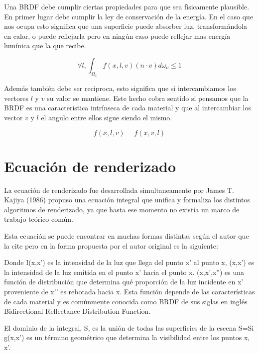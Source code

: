 Una BRDF debe cumplir ciertas propiedades para que sea físicamente plausible.
En primer lugar debe cumplir la ley de conservación de la energía. En el caso que nos ocupa esto significa que una superficie puede absorber luz, transformándola en calor, o puede reflejarla pero en ningún caso puede reflejar mas energía lumínica que la que recibe.

\begin{equation}
\forall l, \int_{\Omega_x} f(x,l,v) (n \cdot v) d\omega_o \leq 1
\end{equation}

Además también debe ser reciproca, esto significa que si intercambiamos los vectores $l$ y $v$ su valor se mantiene. Este hecho cobra sentido si pensamos que la BRDF es una característica intrínseca de cada material y que al intercambiar los vector $v$ y $l$ el angulo entre ellos sigue siendo el mismo.

\begin{equation}
f(x, l, v) = f(x, v, l)
\end{equation} 

\clearpage

\section{Ecuación de renderizado}

La ecuación de renderizado fue desarrollada simultaneamente por James T. Kajiya (1986) propuso una ecuación integral que unifica y formaliza los distintos algoritmos de renderizado, ya que hasta ese momento no existía un marco de trabajo teórico común.

Esta ecuación se puede encontrar en muchas formas distintas según el autor que la cite pero en la forma propuesta por el autor original es la siguiente:

Donde I(x,x’) es la intensidad de la luz que llega del punto x’ al punto x, (x,x') es la intensidad de la luz emitida en el punto x’ hacia el punto x. (x,x',x'') es una función de distribución que determina qué proporción de la luz incidente en x’ proveniente de x’’ es rebotada hacia x. Esta función depende de las características de cada material y es comúnmente conocida como BRDF de sus siglas en inglés Bidirectional Reflectance Distribution Function.

El dominio de la integral, S, es la unión de todas las superficies de la escena S=Si
g(x,x’) es un término geométrico que determina la visibilidad entre los puntos x, x’.

